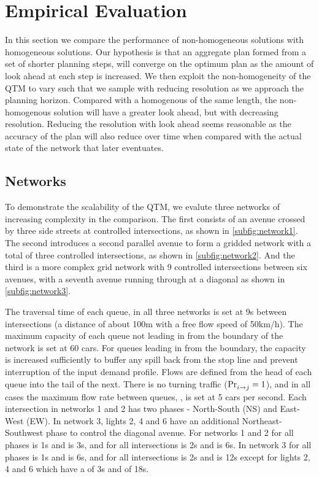 
\section{Empirical Evaluation}
  
In this section we compare the performance of non-homogeneous solutions 
with homogeneous solutions. Our hypothesis is that an aggregate plan formed 
from a set of shorter planning steps, will 
converge on the optimum plan as the amount of look ahead at each step is 
increased. We then exploit the non-homogeneity of the QTM to vary \vecDT such that we sample with reducing 
resolution as we approach the planning horizon. Compared with a homogenous 
 \vecDT of the same length, the non-homogenous solution will have a greater look ahead, but with decreasing resolution. Reducing the resolution with look ahead seems 
reasonable as the accuracy of the plan will also reduce over time when 
compared with the actual state of the network 
that later eventuates. 

\subsection{Networks}

To demonstrate the scalability of the QTM, we evalute three networks of 
increasing complexity
in the comparison. The first consists of an avenue crossed by three 
side streets at controlled intersections, as shown in \cref{subfig:network1}. The 
second introduces a second
parallel avenue to form a gridded network with a total of three controlled
intersections, as shown in \cref{subfig:network2}. And the third is a more complex
grid network with 9 controlled intersections between six avenues, with a 
seventh avenue running through at a diagonal as shown in \cref{subfig:network3}.

The traversal time of each queue, \QDELAY{} in all three networks is set at 9s 
between intersections (a distance of about 100m with a free flow speed of
50km/h). The maximum capacity of each queue not leading in from the 
boundary of the network
is set at 60 cars. For queues leading in from the boundary, the capacity is 
increased sufficiently
to buffer any spill back from the stop line and prevent interruption of the input 
demand profile.
Flows are defined from the head of each queue into the
tail of the next. There is no turning traffic ($\mathrm{Pr}_{i\to j}^{\mathrm{}}=1$), and in all cases the
maximum flow rate between queues, ,  is set at 5 cars per second. Each 
intersection in networks 1 and 2 has
two phases - North-South (NS) and East-West (EW). In network 3, lights 2, 4 
and 6 have an
additional Northeast-Southwest phase to control the diagonal avenue. For 
networks 1 and 2 for all phases \PTMIN{}{} is 1s
and \PTMAX{}{} is 3s, and for all intersections \CTMIN{}{} is 2s and \CTMAX{}{} 
is 6s. In network 3 for all phases \PTMIN{}{} is 1s
and \PTMAX{}{} is 6s, and for all intersections \CTMIN{}{} is 2s and \CTMAX{}{} 
is 12s except for lights 2, 4 and 6 which have a \CTMIN{}{} of 3s and \CTMAX{}
{} of 18s.


